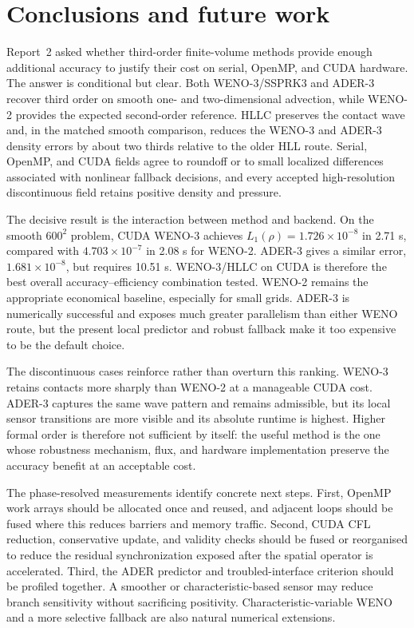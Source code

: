 \chapter{Conclusions and future work}
\label{chap:conclusions}

Report~2 asked whether third-order finite-volume methods provide enough additional accuracy
to justify their cost on serial, OpenMP, and CUDA hardware.  The answer is conditional but
clear.  Both WENO-3/SSPRK3 and ADER-3 recover third order on smooth one- and two-dimensional
advection, while WENO-2 provides the expected second-order reference.  HLLC preserves the
contact wave and, in the matched smooth comparison, reduces the WENO-3 and ADER-3 density
errors by about two thirds relative to the older HLL route.  Serial, OpenMP, and CUDA fields
agree to roundoff or to small localized differences associated with nonlinear fallback
decisions, and every accepted high-resolution discontinuous field retains positive density
and pressure.

The decisive result is the interaction between method and backend.  On the smooth
\(600^2\) problem, CUDA WENO-3 achieves \(L_1(\rho)=1.726\times10^{-8}\) in 2.71 s,
compared with \(4.703\times10^{-7}\) in 2.08 s for WENO-2.  ADER-3 gives a similar error,
\(1.681\times10^{-8}\), but requires 10.51 s.  WENO-3/HLLC on CUDA is therefore the best
overall accuracy--efficiency combination tested.  WENO-2 remains the appropriate economical
baseline, especially for small grids.  ADER-3 is numerically successful and exposes much
greater parallelism than either WENO route, but the present local predictor and robust
fallback make it too expensive to be the default choice.

The discontinuous cases reinforce rather than overturn this ranking.  WENO-3 retains
contacts more sharply than WENO-2 at a manageable CUDA cost.  ADER-3 captures the same wave
pattern and remains admissible, but its local sensor transitions are more visible and its
absolute runtime is highest.  Higher formal order is therefore not sufficient by itself:
the useful method is the one whose robustness mechanism, flux, and hardware implementation
preserve the accuracy benefit at an acceptable cost.

The phase-resolved measurements identify concrete next steps.  First, OpenMP work arrays
should be allocated once and reused, and adjacent loops should be fused where this reduces
barriers and memory traffic.  Second, CUDA CFL reduction, conservative update, and validity
checks should be fused or reorganised to reduce the residual synchronization exposed after
the spatial operator is accelerated.  Third, the ADER predictor and troubled-interface
criterion should be profiled together. A smoother or characteristic-based sensor may reduce
branch sensitivity without sacrificing positivity.  Characteristic-variable WENO and a
more selective fallback are also natural numerical extensions.

